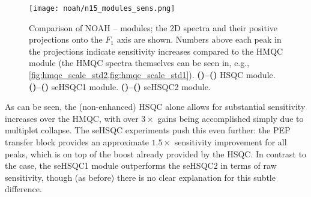\begin{figure}[!ht]
    \centering
    \texttt{[image: noah/n15\_modules\_sens.png]}%
    {\label{fig:n15_sens_hsqc}}%
    {\label{fig:n15_sens_hsqcp}}%
    {\label{fig:n15_sens_sehsqc1}}%
    {\label{fig:n15_sens_sehsqc1p}}%
    {\label{fig:n15_sens_sehsqc2}}%
    {\label{fig:n15_sens_sehsqc2p}}%
    \caption[Comparison of sensitivities of NOAH \nitrogen{} modules]{
        Comparison of NOAH \proton{}--\nitrogen{} modules; the 2D spectra and their positive projections onto the $F_1$ axis are shown.
        Numbers above each peak in the projections indicate sensitivity increases compared to the HMQC module (the HMQC spectra themselves can be seen in, e.g., \cref{fig:hmqc_scale_std2,fig:hmqc_scale_std1}).
        \textbf{()--()} HSQC module.
        \textbf{()--()} seHSQC1 module.
        \textbf{()--()} seHSQC2 module.
    }
    \label{fig:n15_sens}
\end{figure}

As can be seen, the (non-enhanced) HSQC alone allows for substantial sensitivity increases over the HMQC, with over $3\times$ gains being accomplished simply due to multiplet collapse.
The seHSQC experiments push this even further: the PEP transfer block provides an approximate $1.5\times$ sensitivity improvement for all peaks, which is on top of the boost already provided by the HSQC.
In contrast to the \carbon{} case, the \nitrogen{} seHSQC1 module outperforms the seHSQC2 in terms of raw sensitivity, though (as before) there is no clear explanation for this subtle difference.

